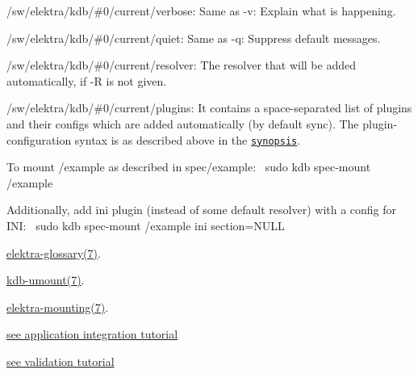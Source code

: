 \begin{DoxyItemize}
\item {\ttfamily /sw/elektra/kdb/\#0/current/verbose}\+: Same as {\ttfamily -\/v}\+: Explain what is happening.
\item {\ttfamily /sw/elektra/kdb/\#0/current/quiet}\+: Same as {\ttfamily -\/q}\+: Suppress default messages.
\item {\ttfamily /sw/elektra/kdb/\#0/current/resolver}\+: The resolver that will be added automatically, if {\ttfamily -\/R} is not given.
\item {\ttfamily /sw/elektra/kdb/\#0/current/plugins}\+: It contains a space-\/separated list of plugins and their configs which are added automatically (by default sync). The plugin-\/configuration syntax is as described above in the \href{#SYNOPSIS}{\tt synopsis}.
\end{DoxyItemize}

To mount /example as described in {\ttfamily spec/example}\+:~\newline
 {\ttfamily sudo kdb spec-\/mount /example}

Additionally, add {\ttfamily ini} plugin (instead of some default resolver) with a config for I\+NI\+:~\newline
 {\ttfamily sudo kdb spec-\/mount /example ini section=N\+U\+LL}


\begin{DoxyItemize}
\item \hyperlink{doc_help_elektra-glossary_md}{elektra-\/glossary(7)}.
\item \hyperlink{doc_help_kdb-umount_md}{kdb-\/umount(7)}.
\item \hyperlink{doc_help_elektra-mounting_md}{elektra-\/mounting(7)}.
\item \hyperlink{doc_tutorials_application-integration_md}{see application integration tutorial}
\item \hyperlink{doc_tutorials_validation_md}{see validation tutorial} 
\end{DoxyItemize}